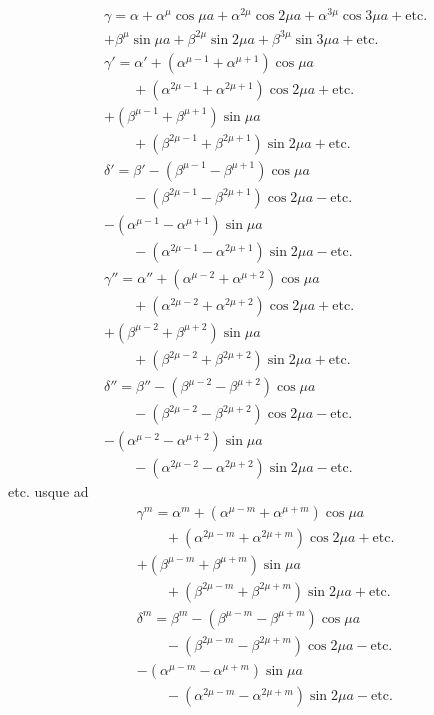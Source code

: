 \[
\begin{aligned}
&\gamma=\alpha+\alpha^{\mu}\cos\mu a+\alpha^{2\mu}\cos2\mu a+\alpha^{3\mu}\cos3\mu a+\mathrm{etc.}\\[5pt]
&+\beta^{\mu}\sin\mu a+\beta^{2\mu}\sin2\mu a+\beta^{3\mu}\sin3\mu a+\mathrm{etc.}\\[5pt]
&\gamma'=\alpha'+(\alpha^{\mu-1}+\alpha^{\mu+1})\cos\mu a\\[5pt]&\qquad{}+(\alpha^{2\mu-1}+\alpha^{2\mu+1})\cos2\mu a+\mathrm{etc.}\\[5pt]
&+(\beta^{\mu-1}+\beta^{\mu+1})\sin\mu a\\[5pt]&\qquad{}+(\beta^{2\mu-1}+\beta^{2\mu+1})\sin2\mu a+\mathrm{etc.}\\[5pt]
&\delta'=\beta'-(\beta^{\mu-1}-\beta^{\mu+1})\cos\mu a\\[5pt]&\qquad{}-(\beta^{2\mu-1}-\beta^{2\mu+1})\cos2\mu a-\mathrm{etc.}\\[5pt]
&-(\alpha^{\mu-1}-\alpha^{\mu+1})\sin\mu a\\[5pt]&\qquad{}-(\alpha^{2\mu-1}-\alpha^{2\mu+1})\sin2\mu a-\mathrm{etc.}\\[5pt]
&\gamma''=\alpha''+(\alpha^{\mu-2}+\alpha^{\mu+2})\cos\mu a\\[5pt]&\qquad{}+(\alpha^{2\mu-2}+\alpha^{2\mu+2})\cos2\mu a+\mathrm{etc.}\\[5pt]
&+(\beta^{\mu-2}+\beta^{\mu+2})\sin\mu a\\[5pt]&\qquad{}+(\beta^{2\mu-2}+\beta^{2\mu+2})\sin2\mu a+\mathrm{etc.}\\[5pt]
&\delta''=\beta''-(\beta^{\mu-2}-\beta^{\mu+2})\cos\mu a\\[5pt]&\qquad{}-(\beta^{2\mu-2}-\beta^{2\mu+2})\cos2\mu a-\mathrm{etc.}\\[5pt]
&-(\alpha^{\mu-2}-\alpha^{\mu+2})\sin\mu a\\[5pt]&\qquad{}-(\alpha^{2\mu-2}-\alpha^{2\mu+2})\sin2\mu a-\mathrm{etc.}
\end{aligned}
\]
etc. usque ad
\[
\begin{aligned}
&\gamma^m=\alpha^m+(\alpha^{\mu-m}+\alpha^{\mu+m})\cos\mu a\\[5pt]&\qquad{}+(\alpha^{2\mu-m}+\alpha^{2\mu+m})\cos2\mu a+\mathrm{etc.}\\[5pt]
&+(\beta^{\mu-m}+\beta^{\mu+m})\sin\mu a\\[5pt]&\qquad{}+(\beta^{2\mu-m}+\beta^{2\mu+m})\sin2\mu a+\mathrm{etc.}\\[5pt]
&\delta^m=\beta^m-(\beta^{\mu-m}-\beta^{\mu+m})\cos\mu a\\[5pt]&\qquad{}-(\beta^{2\mu-m}-\beta^{2\mu+m})\cos2\mu a-\mathrm{etc.}\\[5pt]
&-(\alpha^{\mu-m}-\alpha^{\mu+m})\sin\mu a\\[5pt]&\qquad{}-(\alpha^{2\mu-m}-\alpha^{2\mu+m})\sin2\mu a-\mathrm{etc.}
\end{aligned}
\]
